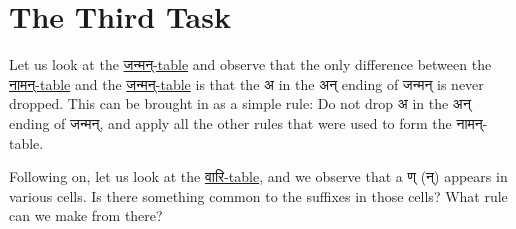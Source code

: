 \documentclass[leqno,fleqn,12pt]{article}%
\begin{document}
\normalsize


\section{The Third Task}
Let us look at the \hyperlink{जन्मन् (नपु॰) Birth}{जन्मन्-table} and observe that the only difference between the \hyperlink{नामन् (नपु॰) Name}{नामन्-table} and the \hyperlink{जन्मन् (नपु॰) Birth}{जन्मन्-table} is that the अ in the अन् ending of जन्मन् is never dropped. This can be brought in as a simple rule: Do not drop अ in the अन् ending of जन्मन्, and apply all the other rules that were used to form the नामन्-table. 

Following on, let us look at the \hyperlink{वारि (नपु॰) Water}{वारि-table}, and we observe that a ण् (न्) appears in various cells. Is there something common to the suffixes in those cells? What rule can we make from there?


\end{document}
